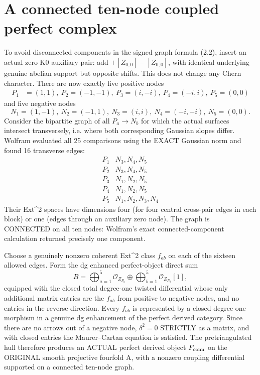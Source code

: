 \documentclass[11pt,a4paper]{article}
\begin{document}
\section{A connected ten-node coupled perfect complex}
To avoid disconnected components in the signed graph
formula (2.2), insert an actual zero-K0 auxiliary pair:
add \(+[Z_{0,0}]-[Z_{0,0}]\), with identical
underlying genuine abelian support but opposite shifts.
This does not change any Chern character.
There are now exactly five positive nodes
\[
 \begin{split}
 P_1&=(1,1),\ P_2=(-1,-1),\
 P_3=(i,-i),\ P_4=(-i,i),\ P_5=(0,0)
 \end{split}
\]
and five negative nodes
\[
 N_1=(1,-1),\ N_2=(-1,1),\
 N_3=(i,i),\ N_4=(-i,-i),\ N_5=(0,0).
\]
Consider the bipartite graph of all \(P_a\to N_b\)
for which the actual surfaces intersect transversely,
i.e. where both corresponding Gaussian slopes differ.
Wolfram evaluated all 25 comparisons using the
EXACT Gaussian norm and found 16 transverse edges:
\[
\begin{array}{c|l}
P_1&N_3,N_4,N_5\\
P_2&N_3,N_4,N_5\\
P_3&N_1,N_2,N_5\\
P_4&N_1,N_2,N_5\\
P_5&N_1,N_2,N_3,N_4
\end{array}
\]
Their Ext^2 spaces have dimensions four
(for four central cross-pair edges in each block)
or one (edges through an auxiliary zero node).
The graph is CONNECTED on all ten nodes:
Wolfram's exact connected-component calculation
returned precisely one component.

Choose a genuinely nonzero coherent Ext^2 class
\(f_{ab}\) on each of the sixteen allowed edges.
Form the dg enhanced perfect-object direct sum
\[
 B=\bigoplus_{a=1}^5\mathcal O_{Z_{P_a}}
       \oplus
      \bigoplus_{b=1}^5\mathcal O_{Z_{N_b}}[1],
\]
equipped with the closed total degree-one
twisted differential whose only additional matrix
entries are the \(f_{ab}\) from positive to
negative nodes, and no entries in the reverse
direction. Every \(f_{ab}\) is represented by a
closed degree-one morphism in a genuine dg
enhancement of the perfect derived category.
Since there are no arrows out of a negative
node, \(\delta^2=0\) STRICTLY as a matrix,
and with closed entries the Maurer--Cartan
equation is satisfied. The pretriangulated
hull therefore produces an ACTUAL perfect
derived object \(F_{\rm conn}\) on the ORIGINAL
smooth projective fourfold A, with a nonzero
coupling differential supported on a
connected ten-node graph.
\end{document}
